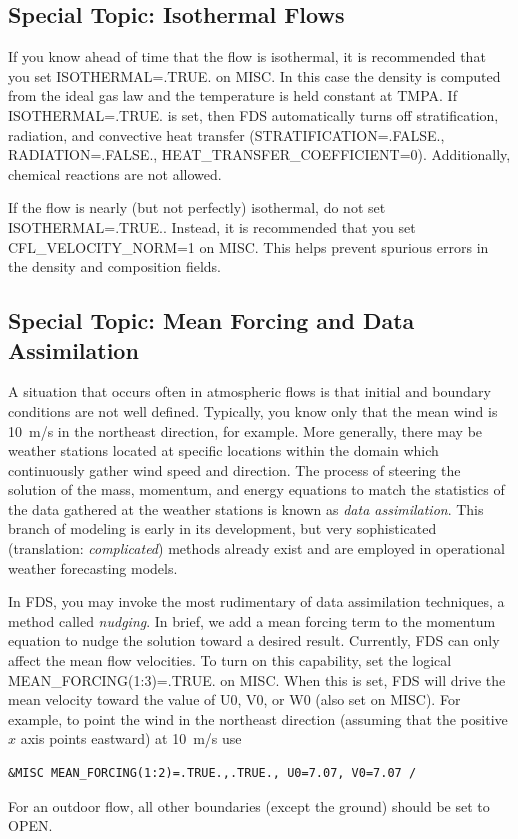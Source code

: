 \documentclass[11pt]{book}
\begin{document}
\subsection{Special Topic: Isothermal Flows}
\label{info:isothermal}

If you know ahead of time that the flow is isothermal, it is recommended that you set {\ct ISOTHERMAL=.TRUE.} on {\ct MISC}.  In this case the density is computed from the ideal gas law and the temperature is held constant at {\ct TMPA}.  If {\ct ISOTHERMAL=.TRUE.} is set, then FDS automatically turns off stratification, radiation, and convective heat transfer ({\ct STRATIFICATION=.FALSE.}, {\ct RADIATION=.FALSE.}, {\ct HEAT\_TRANSFER\_COEFFICIENT=0}).  Additionally, chemical reactions are not allowed.

If the flow is nearly (but not perfectly) isothermal, do not set {\ct ISOTHERMAL=.TRUE.}.  Instead, it is recommended that you set {\ct CFL\_VELOCITY\_NORM=1} on {\ct MISC}.  This helps prevent spurious errors in the density and composition fields.

\subsection{Special Topic: Mean Forcing and Data Assimilation}
\label{info:mean_forcing}

A situation that occurs often in atmospheric flows is that initial and boundary conditions are not well defined.  Typically, you know only that the mean wind is 10~m/s in the northeast direction, for example.  More generally, there may be weather stations located at specific locations within the domain which continuously gather wind speed and direction.  The process of steering the solution of the mass, momentum, and energy equations to match the statistics of the data gathered at the weather stations is known as \emph{data assimilation}.  This branch of modeling is early in its development, but very sophisticated (translation: \emph{complicated}) methods already exist \cite{Kalnay:2003} and are employed in operational weather forecasting models.

In FDS, you may invoke the most rudimentary of data assimilation techniques, a method called \emph{nudging}.  In brief, we add a mean forcing term to the momentum equation to nudge the solution toward a desired result.  Currently, FDS can only affect the mean flow velocities.  To turn on this capability, set the logical {\ct MEAN\_FORCING(1:3)=.TRUE.} on {\ct MISC}.  When this is set, FDS will drive the mean velocity toward the value of {\ct U0}, {\ct V0}, or {\ct W0} (also set on {\ct MISC}).  For example, to point the wind in the northeast direction (assuming that the positive $x$ axis points eastward) at 10~m/s use
\begin{lstlisting}
&MISC MEAN_FORCING(1:2)=.TRUE.,.TRUE., U0=7.07, V0=7.07 /
\end{lstlisting}
For an outdoor flow, all other boundaries (except the ground) should be set to {\ct OPEN}.
\end{document}
